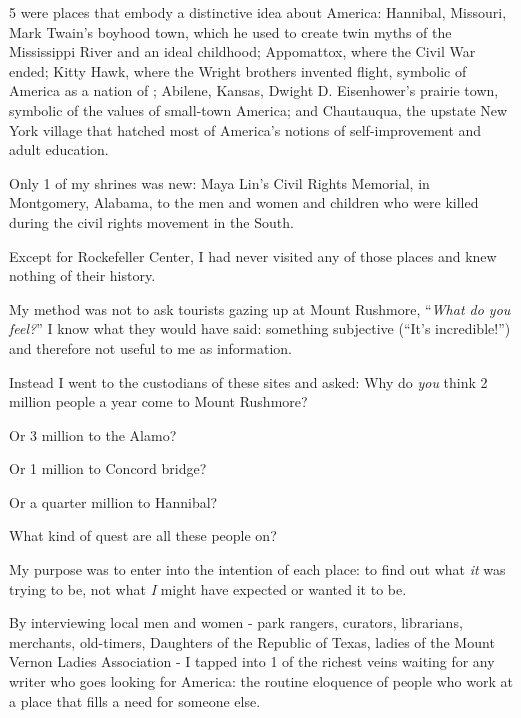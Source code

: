 \documentclass{book}
\numberwithin{equation}{section}
\begin{document}
5 were places that embody a distinctive idea about America: Hannibal, Missouri, Mark Twain's boyhood town, which he used to create twin myths of the Mississippi River and an ideal childhood; Appomattox, where the Civil War ended; Kitty Hawk, where the Wright brothers invented flight, symbolic of America as a nation of ; Abilene, Kansas, Dwight D. Eisenhower's prairie town, symbolic of the values of small-town America; and Chautauqua, the upstate New York village that hatched most of America's notions of self-improvement and adult education.

Only 1 of my shrines was new: Maya Lin's Civil Rights Memorial, in Montgomery, Alabama, to the men and women and children who were killed during the civil rights movement in the South.

Except for Rockefeller Center, I had never visited any of those places and knew nothing of their history.

%
My method was not to ask tourists gazing up at Mount Rushmore, ``\textit{What do you feel?}'' I know what they would have said: something subjective (``It's incredible!'') and therefore not useful to me as information.

Instead I went to the custodians of these sites and asked: Why do \textit{you} think 2 million people a year come to Mount Rushmore?

Or 3 million to the Alamo?

Or 1 million to Concord bridge?

Or a quarter million to Hannibal?

What kind of quest are all these people on?

My purpose was to enter into the intention of each place: to find out what \textit{it} was trying to be, not what \textit{I} might have expected or wanted it to be.

%
By interviewing local men and women - park rangers, curators, librarians, merchants, old-timers, Daughters of the Republic of Texas, ladies of the Mount Vernon Ladies Association - I tapped into 1 of the richest veins waiting for any writer who goes looking for America: the routine eloquence of people who work at a place that fills a need for someone else.
\end{document}
